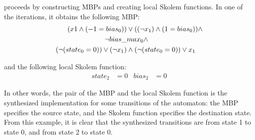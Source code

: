 \aeval proceeds by constructing MBPs and creating local Skolem functions. 
In one of the iterations, it obtains the following MBP:%
\begin{equation}
\begin{aligned}
  (x1\land (-1=bias_0)) &\lor ((\neg x_1)\land (1=bias_0)) \land \\
  \neg bias\_&max_0 \land \\
  (\neg (state_0=0))\lor (\neg x_1) &\land
  (\neg (state_0=0))\lor x_1  \notag
\end{aligned}
\end{equation}

and the following local Skolem function:%
\begin{align*}
  state_2&=0 &
  bias_2&=0
\end{align*}

In other words, the pair of the MBP and the local Skolem function is the synthesized implementation for some transitions of the automaton: the MBP specifies the source state, and the Skolem function specifies the destination state.
From this example, it is clear that the synthesized transitions are from state 1 to state 0, and from state 2 to state 0.